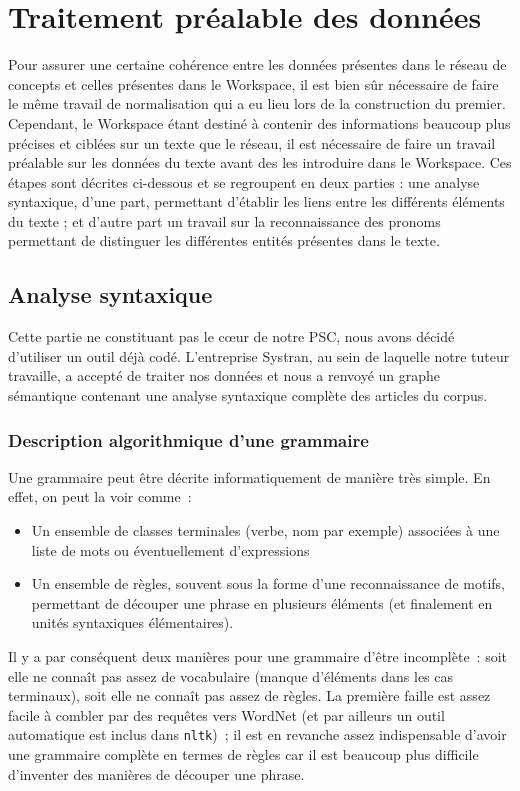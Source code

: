 \documentclass[a4paper, 12pt]{article}
\newcommand{\pyt}[1]{\texttt{#1}}%
\begin{document}
\section{Traitement préalable des données}

Pour assurer une certaine cohérence entre les données présentes dans le réseau de concepts et celles présentes dans le Workspace, il est bien sûr nécessaire de faire le même travail de normalisation qui a eu lieu lors de la construction du premier. Cependant, le Workspace étant destiné à contenir des informations beaucoup plus précises et ciblées sur un texte que le réseau, il est nécessaire de faire un travail préalable sur les données du texte avant des les introduire dans le Workspace. Ces étapes sont décrites ci-dessous et se regroupent en deux parties : une analyse syntaxique, d'une part, permettant d'établir les liens entre les différents éléments du texte ; et d'autre part un travail sur la reconnaissance des pronoms permettant de distinguer les différentes entités présentes dans le texte.

\subsection{Analyse syntaxique}

Cette partie ne constituant pas le c\oe{}ur de notre PSC, nous avons décidé d'utiliser un outil déjà codé. L'entreprise Systran, au sein de laquelle notre tuteur travaille, a accepté de traiter nos données et nous a renvoyé un graphe sémantique contenant une analyse syntaxique complète des articles du corpus.

\subsubsection{Description algorithmique d'une grammaire}
Une grammaire peut être décrite informatiquement de manière très simple. En effet, on peut la voir comme~:
\begin{itemize}
	\item Un ensemble de classes terminales (verbe, nom par exemple) associées à une liste de mots ou éventuellement d'expressions
	\item Un ensemble de règles, souvent sous la forme d'une reconnaissance de motifs, permettant de découper une phrase en plusieurs éléments (et finalement en unités syntaxiques élémentaires).
\end{itemize}

Il y a par conséquent deux manières pour une grammaire d'être incomplète~: soit elle ne connaît pas assez de vocabulaire (manque d'éléments dans les cas terminaux), soit elle ne connaît pas assez de règles. La première faille est assez facile à combler par des requêtes vers WordNet (et par ailleurs un outil automatique est inclus dans \pyt{nltk})~; il est en revanche assez indispensable d'avoir une grammaire complète en termes de règles car il est beaucoup plus difficile d'inventer des manières de découper une phrase.
\end{document}

